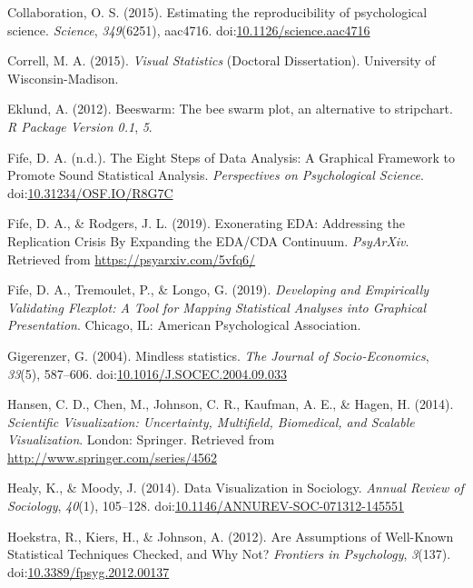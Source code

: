 \documentclass[
  man]{apa6}
\begin{document}
\leavevmode\hypertarget{ref-open_science_collaboration_estimating_2015}{}%
Collaboration, O. S. (2015). Estimating the reproducibility of psychological science. \emph{Science}, \emph{349}(6251), aac4716. doi:\href{https://doi.org/10.1126/science.aac4716}{10.1126/science.aac4716}

\leavevmode\hypertarget{ref-Correll2015}{}%
Correll, M. A. (2015). \emph{Visual Statistics} (Doctoral Dissertation). University of Wisconsin-Madison.

\leavevmode\hypertarget{ref-eklund2012beeswarm}{}%
Eklund, A. (2012). Beeswarm: The bee swarm plot, an alternative to stripchart. \emph{R Package Version 0.1}, \emph{5}.

\leavevmode\hypertarget{ref-Fife2019e}{}%
Fife, D. A. (n.d.). The Eight Steps of Data Analysis: A Graphical Framework to Promote Sound Statistical Analysis. \emph{Perspectives on Psychological Science}. doi:\href{https://doi.org/10.31234/OSF.IO/R8G7C}{10.31234/OSF.IO/R8G7C}

\leavevmode\hypertarget{ref-Fife2019a}{}%
Fife, D. A., \& Rodgers, J. L. (2019). Exonerating EDA: Addressing the Replication Crisis By Expanding the EDA/CDA Continuum. \emph{PsyArXiv}. Retrieved from \url{https://psyarxiv.com/5vfq6/}

\leavevmode\hypertarget{ref-Fife2019d}{}%
Fife, D. A., Tremoulet, P., \& Longo, G. (2019). \emph{Developing and Empirically Validating Flexplot: A Tool for Mapping Statistical Analyses into Graphical Presentation}. Chicago, IL: American Psychological Association.

\leavevmode\hypertarget{ref-Gigerenzer2004}{}%
Gigerenzer, G. (2004). Mindless statistics. \emph{The Journal of Socio-Economics}, \emph{33}(5), 587--606. doi:\href{https://doi.org/10.1016/J.SOCEC.2004.09.033}{10.1016/J.SOCEC.2004.09.033}

\leavevmode\hypertarget{ref-Hansen}{}%
Hansen, C. D., Chen, M., Johnson, C. R., Kaufman, A. E., \& Hagen, H. (2014). \emph{Scientific Visualization: Uncertainty, Multifield, Biomedical, and Scalable Visualization}. London: Springer. Retrieved from \url{http://www.springer.com/series/4562}

\leavevmode\hypertarget{ref-Healy2014a}{}%
Healy, K., \& Moody, J. (2014). Data Visualization in Sociology. \emph{Annual Review of Sociology}, \emph{40}(1), 105--128. doi:\href{https://doi.org/10.1146/ANNUREV-SOC-071312-145551}{10.1146/ANNUREV-SOC-071312-145551}

\leavevmode\hypertarget{ref-hoekstra_are_2012}{}%
Hoekstra, R., Kiers, H., \& Johnson, A. (2012). Are Assumptions of Well-Known Statistical Techniques Checked, and Why Not? \emph{Frontiers in Psychology}, \emph{3}(137). doi:\href{https://doi.org/10.3389/fpsyg.2012.00137}{10.3389/fpsyg.2012.00137}
\end{document}
